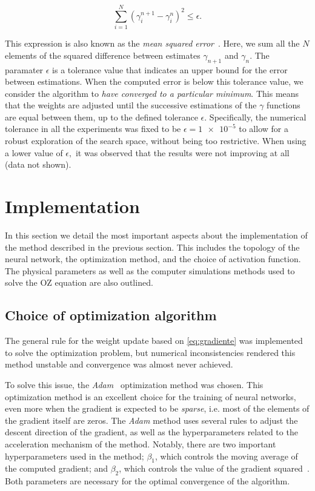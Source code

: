 \begin{equation}
    \sum_{i=1}^{N} {\left( \gamma^{n+1}_{i} - \gamma^{n}_{i} \right)}^2 \leq \epsilon .
    \label{eq:tolerancia}
\end{equation}

This expression is also known as the \emph{mean squared error}~\cite{goodfellowDeepLearning2016}.
Here, we sum all the $N$ elements of the squared difference between estimates $\gamma_{n+1}$
and $\gamma_{n}$. The paramater $\epsilon$ is a tolerance value that indicates an 
upper bound for the error between estimations. When the computed error is below this 
tolerance value, we consider the algorithm to \emph{have converged to a particular minimum}.
This means that the weights are adjusted until the successive estimations of the $\gamma$
functions are equal between them, up to the defined tolerance $\epsilon$.
Specifically, the numerical tolerance in all the experiments was fixed to be
$\epsilon = \num{1e-5}$ to allow for a robust exploration of the search space, without being
too restrictive. When using a lower value of $\epsilon,$ it was observed that the results 
were not improving at all (data not shown).

\section{Implementation}
In this section we detail the most important aspects about the implementation of the
method described in the previous section. This includes the topology of the neural network,
the optimization method, and the choice of activation function. The physical parameters
as well as the computer simulations methods used to solve the OZ equation are also outlined.

\subsection{Choice of optimization algorithm}
The general rule for the weight update based on \autoref{eq:gradiente} was
implemented to solve the optimization problem, but numerical inconsistencies rendered this 
method unstable and convergence was almost never achieved.

To solve this issue, the \emph{Adam}~\cite{kingmaAdamMethodStochastic2017} optimization 
method was chosen. This optimization method is an excellent choice for the training
of neural networks, even more when the gradient is expected to be \emph{sparse}, i.e.
most of the elements of the gradient itself are zeros.
The \emph{Adam} method uses several rules to adjust the descent direction of the gradient,
as well as the hyperparameters related to the acceleration mechanism of the method.
Notably, there are two important hyperparameters used in the method; $\beta_1$,
which controls the moving average of the computed gradient; and $\beta_2$, which controls
the value of the gradient squared~\cite{kingmaAdamMethodStochastic2017}. Both parameters 
are necessary for the optimal convergence of the algorithm.

